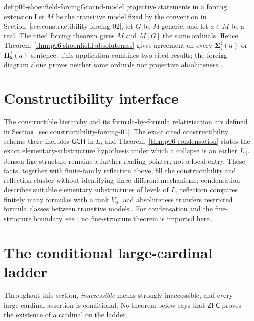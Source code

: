 \begin{hbexample}{def:p06-shoenfield-forcing}{Ground-model projective statements in a forcing extension}
Let \(M\) be the transitive model fixed by the convention in
Section~\ref{sec:constructibility-forcing-02}, let \(G\) be \(M\)-generic, and let
\(a\in M\) be a real.  The cited forcing theorem gives \(M\) and \(M[G]\) the
same ordinals.  Hence Theorem~\ref{thm:p06-shoenfield-absoluteness} gives
agreement on every
\(\boldsymbol\Sigma^1_2(a)\) or \(\boldsymbol\Pi^1_2(a)\) sentence.  This
application combines two cited results; the forcing diagram alone proves
neither same ordinals nor projective absoluteness
\cite{Jech2003,Moschovakis2009}.
\end{hbexample}

\section{Constructibility interface}
\label{sec:p06-constructibility-interface}

The constructible hierarchy and its formula-by-formula relativization are
defined in Section~\ref{sec:constructibility-forcing-01}.  The exact cited
constructibility scheme there includes \(\mathsf{GCH}\) in \(L\), and
Theorem~\ref{thm:p06-condensation} states the exact elementary-substructure
hypothesis under which a collapse is an earlier \(L_\beta\).  Jensen fine
structure remains a further-reading pointer, not a local entry.  These facts,
together with finite-family reflection above, fill the constructibility and
reflection cluster without identifying three different mechanisms:
condensation describes suitable elementary substructures of levels of \(L\),
reflection compares finitely many formulas with a rank \(V_\alpha\), and
absoluteness transfers restricted formula classes between transitive models
\cite[Chapters~12--13]{Jech2003}.  For condensation and the fine-structure
boundary, see \cite{Devlin1984}; no fine-structure theorem is imported here.

\section{The conditional large-cardinal ladder}
\label{sec:p06-large-cardinal-ladder}

Throughout this section, \emph{inaccessible} means strongly inaccessible, and
every large-cardinal assertion is conditional.  No theorem below says that
\(\mathsf{ZFC}\) proves the existence of a cardinal on the ladder.

